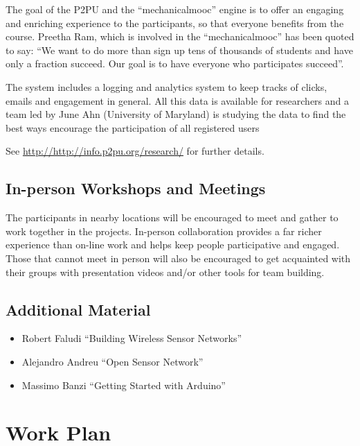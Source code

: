 \documentclass[a4paper,oneside]{book}   %
\begin{document}
The goal of the P2PU and the ``mechanicalmooc'' engine is to offer an engaging and enriching experience to the participants, so that everyone benefits from the course.
Preetha Ram, which is involved in the ``mechanicalmooc'' has been quoted to say: ``We want to do more than sign up tens of thousands of students and have only a fraction succeed. Our goal is to have everyone who participates succeed''.

The system includes a logging and analytics system to keep tracks of clicks, emails and engagement in general.
All this data is available for researchers and a team led by June Ahn (University of Maryland) is studying the data to find the best ways encourage the participation of all registered users \cite{ahn2013dop}

See \url{http://http://info.p2pu.org/research/} for further details.

\subsection{In-person Workshops and Meetings}

The participants in nearby locations will be encouraged to meet and gather to work together in the projects.
In-person collaboration provides a far richer experience than on-line work and helps keep people participative and engaged.
Those that cannot meet in person will also be encouraged to get acquainted with their groups with presentation videos and/or other tools for team building.

\subsection{Additional Material}

\begin{itemize}
\item Robert Faludi ``Building Wireless Sensor Networks'' \cite{faludi2010bws}
\item Alejandro Andreu ``Open Sensor Network'' \cite{andreu2013osn}
\item Massimo Banzi ``Getting Started with Arduino'' \cite{banzi2009gsa}
\end{itemize}



\section{Work Plan}
\end{document}

